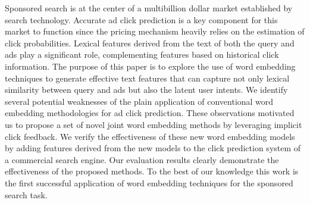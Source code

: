 Sponsored search is at the center of a multibillion dollar market established by search technology. Accurate ad click prediction is a key component for this market to function since the pricing mechanism heavily relies on the estimation of click probabilities. Lexical features derived from the text of both the query and ads play a significant role, complementing features based on historical click information. The purpose of this paper is to explore the use of word embedding techniques to generate effective text features that can capture not only lexical similarity between query and ads but also the latent user intents. We identify several potential weaknesses of the plain application of conventional word embedding methodologies for ad click prediction. These observations motivated us to propose a set of novel joint word embedding methods by leveraging implicit click feedback. We verify the effectiveness of these new word embedding models by adding features derived from the new models to the click prediction system of a commercial search engine. Our evaluation results clearly demonstrate the effectiveness of the proposed methods. To the best of our knowledge this work is the first successful application of word embedding techniques for the sponsored search task.
